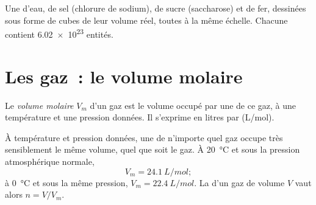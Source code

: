 \begin{omfigure}

{\small Une  d'eau, de sel (chlorure de sodium), de sucre
(saccharose) et de fer, dessinées sous forme de cubes de leur volume
réel, toutes à la même échelle. Chacune contient \num{6.02e23}
entités.}
\end{omfigure}

\section{Les gaz~: le volume molaire}

\begin{definition}\label{def:g10:the-mole:molar-volume}
Le \emph{volume molaire} $V_m$ d'un gaz est le
volume occupé par une  de ce gaz, à une température et une pression
données. Il s'exprime en litres par  (\si{L/mol}).
\end{definition}

\begin{proposition}\label{prop:g10:the-mole:avogadro-law}
À température et pression données, une  de n'importe quel gaz
occupe très sensiblement le même volume, quel que soit le gaz. À
\qty{20}{\celsius} et sous la pression atmosphérique normale,
\[
  V_m = \qty{24.1}{L/mol};
\]
à \qty{0}{\celsius} et sous la même pression, $V_m = \qty{22.4}{L/mol}$.
La  d'un gaz de volume $V$ vaut alors $n = V / V_m$.
\end{proposition}


